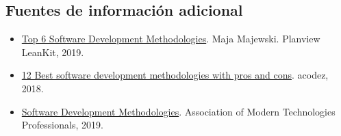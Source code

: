 \subsection{Fuentes de información adicional}
\begin{itemize}
\item \href{https://leankit.com/blog/2019/03/top-6-software-development-methodologies/}{Top
  6 Software Development Methodologies}. Maja Majewski. Planview
  LeanKit, 2019.
\item \href{https://acodez.in/12-best-software-development-methodologies-pros-cons/}{12
  Best software development methodologies with pros and cons}. acodez,
  2018.
\item \href{http://www.itinfo.am/eng/software-development-methodologies/}{Software
  Development Methodologies}. Association of Modern Technologies
  Professionals, 2019.
\end{itemize}
